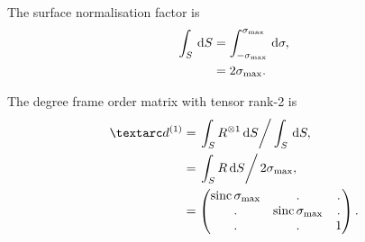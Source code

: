 The surface normalisation factor is
\begin{subequations}
\begin{align}
    \int_S \,\mathrm{d} S &= \int_{-\sigma_\textrm{max}}^{\sigma_\textrm{max}} \,\mathrm{d} \sigma , \\
                   &= 2\sigma_\textrm{max} .
\end{align}
\end{subequations}



The  degree frame order matrix with tensor rank-2 is
\begin{subequations} \label{eq: rotor 1st degree frame order matrix}
\begin{align}
    \FOone &= \left. \int_S R^{\otimes 1} \diff S \right / \int_S \diff S, \\
           &= \left. \int_S R \diff S \right / 2\conesmax, \\
           &= \begin{pmatrix}
                  \sinc\conesmax & .              & . \\
                  .              & \sinc\conesmax & . \\
                  .              & .              & 1 \\
              \end{pmatrix} .
\end{align}
\end{subequations}



